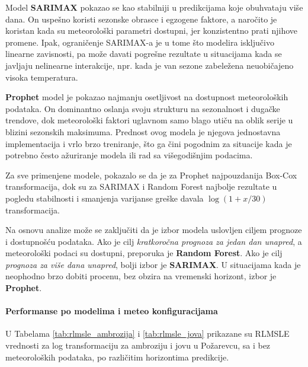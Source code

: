 \documentclass[12pt]{article}
\begin{document}
Model \textbf{SARIMAX} pokazao se kao stabilniji u predikcijama koje obuhvataju više dana. On uspešno koristi sezonske obrasce i egzogene faktore, a naročito je koristan kada su meteorološki parametri dostupni, jer konzistentno prati njihove promene. Ipak, ograničenje SARIMAX-a je u tome što modelira isključivo linearne zavisnosti, pa može davati pogrešne rezultate u situacijama kada se javljaju nelinearne interakcije, npr. kada je van sezone zabeležena neuobičajeno visoka temperatura.

\textbf{Prophet} model je pokazao najmanju osetljivost na dostupnost meteoroloških podataka. On dominantno oslanja svoju strukturu na sezonalnost i dugačke trendove, dok meteorološki faktori uglavnom samo blago utiču na oblik serije u blizini sezonskih maksimuma. Prednost ovog modela je njegova jednostavna implementacija i vrlo brzo treniranje, što ga čini pogodnim za situacije kada je potrebno često ažuriranje modela ili rad sa višegodišnjim podacima.

Za sve primenjene modele, pokazalo se da je za Prophet najpouzdanija Box-Cox transformacija, dok su za SARIMAX i Random Forest najbolje rezultate u pogledu stabilnosti i smanjenja varijanse greške davala $\log(1 + x/30)$ transformacija.

Na osnovu analize može se zaključiti da je izbor modela uslovljen ciljem prognoze i dostupnošću podataka. Ako je cilj \textit{kratkoročna prognoza za jedan dan unapred}, a meteorološki podaci su dostupni, preporuka je \textbf{Random Forest}. Ako je cilj \textit{prognoza za više dana unapred}, bolji izbor je \textbf{SARIMAX}. U situacijama kada je neophodno brzo dobiti procenu, bez obzira na vremenski horizont, izbor je \textbf{Prophet}.

\paragraph{Performanse po modelima i meteo konfiguracijama}

U Tabelama \ref{tab:rlmsle_ambrozija} i \ref{tab:rlmsle_jova} prikazane su RLMSLE vrednosti za log transformaciju za ambroziju i jovu u Požarevcu, sa i bez meteoroloških podataka, po različitim horizontima predikcije. 
\end{document}
